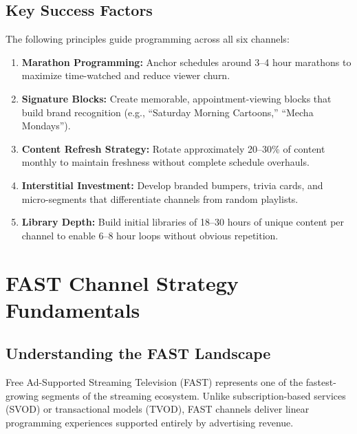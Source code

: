 \documentclass[12pt,letterpaper,twoside]{report}
\begin{document}
\section*{Key Success Factors}

The following principles guide programming across all six channels:

\begin{enumerate}[leftmargin=2cm]
    \item \textbf{Marathon Programming:} Anchor schedules around 3--4 hour marathons to maximize time-watched and reduce viewer churn.
    \item \textbf{Signature Blocks:} Create memorable, appointment-viewing blocks that build brand recognition (e.g., ``Saturday Morning Cartoons,'' ``Mecha Mondays'').
    \item \textbf{Content Refresh Strategy:} Rotate approximately 20--30\% of content monthly to maintain freshness without complete schedule overhauls.
    \item \textbf{Interstitial Investment:} Develop branded bumpers, trivia cards, and micro-segments that differentiate channels from random playlists.
    \item \textbf{Library Depth:} Build initial libraries of 18--30 hours of unique content per channel to enable 6--8 hour loops without obvious repetition.
\end{enumerate}

\clearpage
{}

\chapter{FAST Channel Strategy Fundamentals}
\label{ch:fundamentals}

\section{Understanding the FAST Landscape}

Free Ad-Supported Streaming Television (FAST) represents one of the fastest-growing segments of the streaming ecosystem. Unlike subscription-based services (SVOD) or transactional models (TVOD), FAST channels deliver linear programming experiences supported entirely by advertising revenue.
\end{document}
